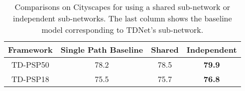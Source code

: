 \documentclass[10pt,twocolumn,letterpaper]{article}
\begin{document}
\begin{table}[t]
\centering
{}
\vspace{0.05cm}
\caption{Effect of different downsampling stride  on Cityscapes. 
}
\label{tab6}
\end{table}

\begin{table}[t]
\centering
\small
\begin{tabular}{ |c|c|c|c|} 
 \hline
 Framework &Single Path Baseline &Shared & Independent\\ 
 \hline 
 \hline 
 \footnotesize{TD-PSP50}   &78.2    &78.5 & \textbf{79.9}\\ 
 \footnotesize{TD-PSP18}   &75.5    &75.7 & \textbf{76.8}\\ 
 \hline
\end{tabular}
\vspace{0.1cm}
\caption{\small{Comparisons on Cityscapes for using a shared sub-network or independent sub-networks. The last column shows the baseline model corresponding to TDNet's sub-network.}}
\label{tab7}
\vspace{-0.6cm}
\end{table}
\end{document}
